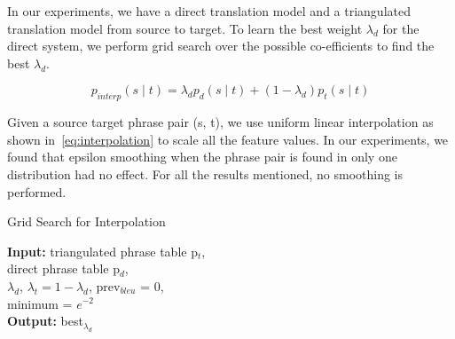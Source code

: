         In our experiments, we have a direct translation model and a triangulated translation model from source to target. To learn the best weight $\lambda_{d}$ for the direct system, we perform grid search over the possible co-efficients to find the best $\lambda_{d}$.


        \begin{equation} \label{eq:interpolation}
                p_{interp}(s \mid t) = \lambda_{d} p_{d}(s \mid t) + (1 - \lambda_{d}) p_{t}(s \mid t)
        \end{equation}

        Given a source target phrase pair (s, t), we use uniform linear interpolation as shown in~\eqref{eq:interpolation} to scale all the feature values. In our experiments, we found that epsilon smoothing when the phrase pair is found in only one distribution had no effect. For all the results mentioned, no smoothing is performed.

         \begin{algorithm}
                \small
                \caption{Grid Search for Interpolation}
                \label{algo:condor}
                \textbf{Input:} triangulated phrase table p$_{t}$, \\ direct phrase table p$_{d}$, \\
                $\lambda_{d}$, $\lambda_{t} = 1 - \lambda_{d}$, prev$_{bleu}$ = 0, \\
                minimum = $e ^{-2}$ \\
                \textbf{Output:} best$_{\lambda_{d}}$


                \begin{algorithmic}[l]
                         \label{aline:condition}
                         \label{aline:inter}
                         \label{aline:search}
                        \ENDWHILE
                       \end{algorithmic}
        \end{algorithm}


